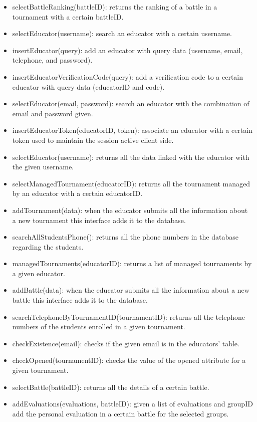 \documentclass[12pt, a4paper]{report}
\begin{document}
\begin{itemize}
        \item selectBattleRanking(battleID): returns the ranking of a battle in a tournament with a certain battleID. 
        \item selectEducator(username): search an educator with a certain username. 
        \item insertEducator(query): add an educator with query data (username, email, telephone, and password). 
        \item insertEducatorVerificationCode(query): add a verification code to a certain educator with query data (educatorID and code). 
        \item selectEducator(email, password): search an educator with the combination of email and password given. 
        \item insertEducatorToken(educatorID, token): associate an educator with a certain token used to maintain the session active client side. 
        \item selectEducator(username): returns all the data linked with the educator with the given username. 
        \item selectManagedTournament(educatorID): returns all the tournament managed by an educator with a certain educatorID. 
        \item addTournament(data): when the educator submits all the information about a new tournament this interface adds it to the database. 
        \item searchAllStudentsPhone(): returns all the phone numbers in the database regarding the students. 
        \item managedTournaments(educatorID): returns a list of managed tournaments by a given educator. 
        \item addBattle(data): when the educator submits all the information about a new battle this interface adds it to the database. 
        \item searchTelephoneByTournamentID(tournamentID): returns all the telephone numbers of the students enrolled in a given tournament. 
        \item checkExistence(email): checks if the given email is in the educators' table. 
        \item checkOpened(tournamentID): checks the value of the opened attribute for a given tournament. 
        \item selectBattle(battleID): returns all the details of a certain battle. 
        \item addEvaluations(evaluations, battleID): given a list of evaluations and groupID add the personal evaluation in a certain battle for the selected groups. 

\end{itemize}
\end{document}
